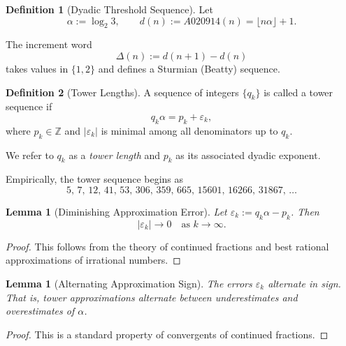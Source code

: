 \documentclass[12pt, oneside]{article}
\numberwithin{equation}{section}
\theoremstyle{definition}
\newtheorem{definition}{Definition}[section]
\theoremstyle{plain}
\newtheorem{lemma}[theorem]{Lemma}
\theoremstyle{remark}
\begin{document}

\begin{definition}[Dyadic Threshold Sequence]
Let
\[
\alpha := \log_2 3,
\qquad
d(n) := A020914(n) = \lfloor n\alpha \rfloor + 1.
\]
\end{definition}

The increment word
\[
\Delta(n) := d(n+1)-d(n)
\]
takes values in $\{1,2\}$ and defines a Sturmian (Beatty) sequence.


\begin{definition}[Tower Lengths]
A sequence of integers $\{q_k\}$ is called a tower sequence if
\[
q_k \alpha = p_k + \varepsilon_k,
\]
where $p_k \in \mathbb{Z}$ and $|\varepsilon_k|$ is minimal among all
denominators up to $q_k$.

We refer to $q_k$ as a \emph{tower length} and $p_k$ as its associated
dyadic exponent.
\end{definition}

Empirically, the tower sequence begins as
\[
5,\,7,\,12,\,41,\,53,\,306,\,359,\,665,\,15601,\,16266,\,31867,\,\dots
\]


\begin{lemma}[Diminishing Approximation Error]
\label{lem:tower-error}
Let $\varepsilon_k := q_k \alpha - p_k$.
Then
\[
|\varepsilon_k| \to 0 \quad \text{as } k \to \infty.
\]
\end{lemma}

\begin{proof}
This follows from the theory of continued fractions and best rational
approximations of irrational numbers.
\end{proof}


\begin{lemma}[Alternating Approximation Sign]
\label{lem:alternating}
The errors $\varepsilon_k$ alternate in sign.  That is,
tower approximations alternate between underestimates and overestimates
of $\alpha$.
\end{lemma}

\begin{proof}
This is a standard property of convergents of continued fractions.
\end{proof}
\end{document}
